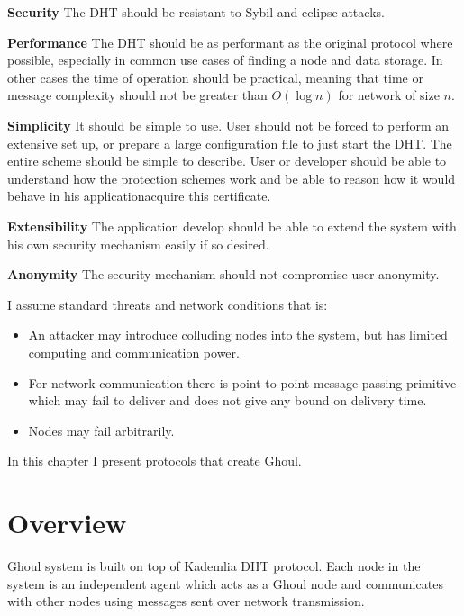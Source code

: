 \begin{description}
  \item{\textbf{Security}} The DHT should be resistant to Sybil and
    eclipse attacks.
  \item{\textbf{Performance}} The DHT should be as performant as the original
    protocol where possible, especially in common use cases of finding a node
    and data storage. In other cases the time of operation should be practical,
    meaning that time or message complexity should not be greater than $O(\log
    n)$ for network of size $n$.
  \item{\textbf{Simplicity}} It should be simple to use. User should not be
    forced to perform an extensive set up, or prepare a large configuration file
    to just start the DHT.  The entire scheme should be simple to describe. User
    or developer should be able to understand how the protection schemes work
    and be able to reason how it would behave in his applicationacquire this
    certificate.
  \item{\textbf{Extensibility}} The application develop should be able to extend
    the system with his own security mechanism easily if so desired.
  \item{\textbf{Anonymity}} The security mechanism should not compromise user
    anonymity.
\end{description}

I assume standard threats and network conditions that is:

\begin{itemize}
  \item An attacker may introduce colluding nodes into the system, but has
    limited computing and communication power.
  \item For network communication there is point-to-point message passing
    primitive which may fail to deliver and does not give any bound on delivery
    time.
  \item Nodes may fail arbitrarily.
\end{itemize}

In this chapter I present protocols that create Ghoul.

\section{Overview}
Ghoul system is built on top of Kademlia DHT protocol. Each node in the system
is an independent agent which acts as a Ghoul node and communicates with other
nodes using messages sent over network transmission.

